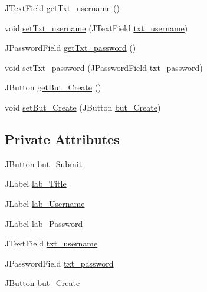 \begin{DoxyCompactItemize}
\item 
J\+Text\+Field \mbox{\hyperlink{classcom_1_1_b_n_u_1_1pages_1_1login_1_1_login_model_ae4bb70b9e0ad4b42bd2391856e3fbf5c}{get\+Txt\+\_\+username}} ()
\item 
void \mbox{\hyperlink{classcom_1_1_b_n_u_1_1pages_1_1login_1_1_login_model_a1308c58f883227b4cffb37662b9983b7}{set\+Txt\+\_\+username}} (J\+Text\+Field \mbox{\hyperlink{classcom_1_1_b_n_u_1_1pages_1_1login_1_1_login_model_ad898496e90497b10e54c04fdfb1ce988}{txt\+\_\+username}})
\item 
J\+Password\+Field \mbox{\hyperlink{classcom_1_1_b_n_u_1_1pages_1_1login_1_1_login_model_a7df9012b5e9dbde1efdd6ba039e95f69}{get\+Txt\+\_\+password}} ()
\item 
void \mbox{\hyperlink{classcom_1_1_b_n_u_1_1pages_1_1login_1_1_login_model_adc19c49064f87cdd3a3c8acfe7d39295}{set\+Txt\+\_\+password}} (J\+Password\+Field \mbox{\hyperlink{classcom_1_1_b_n_u_1_1pages_1_1login_1_1_login_model_a04fd2b2936a74097afe1abcb8fb78da7}{txt\+\_\+password}})
\item 
J\+Button \mbox{\hyperlink{classcom_1_1_b_n_u_1_1pages_1_1login_1_1_login_model_a42a756a69cf1ce361a41ba4ba6b097cf}{get\+But\+\_\+\+Create}} ()
\item 
void \mbox{\hyperlink{classcom_1_1_b_n_u_1_1pages_1_1login_1_1_login_model_a6abd1760149f1a682fff4cd70cd57b74}{set\+But\+\_\+\+Create}} (J\+Button \mbox{\hyperlink{classcom_1_1_b_n_u_1_1pages_1_1login_1_1_login_model_a2bc32c619393c5c5e782667c6e3bc00e}{but\+\_\+\+Create}})
\end{DoxyCompactItemize}
\subsection*{Private Attributes}
\begin{DoxyCompactItemize}
\item 
J\+Button \mbox{\hyperlink{classcom_1_1_b_n_u_1_1pages_1_1login_1_1_login_model_a3e759762502ffaf68c954f69f52aee0a}{but\+\_\+\+Submit}}
\item 
J\+Label \mbox{\hyperlink{classcom_1_1_b_n_u_1_1pages_1_1login_1_1_login_model_ab51c28183844a2ea75a7ee6ac940d946}{lab\+\_\+\+Title}}
\item 
J\+Label \mbox{\hyperlink{classcom_1_1_b_n_u_1_1pages_1_1login_1_1_login_model_a8336b61544313aa6a50f32be5fb3608b}{lab\+\_\+\+Username}}
\item 
J\+Label \mbox{\hyperlink{classcom_1_1_b_n_u_1_1pages_1_1login_1_1_login_model_a15b2461ac4d3a182cdfafe84f1f0c816}{lab\+\_\+\+Password}}
\item 
J\+Text\+Field \mbox{\hyperlink{classcom_1_1_b_n_u_1_1pages_1_1login_1_1_login_model_ad898496e90497b10e54c04fdfb1ce988}{txt\+\_\+username}}
\item 
J\+Password\+Field \mbox{\hyperlink{classcom_1_1_b_n_u_1_1pages_1_1login_1_1_login_model_a04fd2b2936a74097afe1abcb8fb78da7}{txt\+\_\+password}}
\item 
J\+Button \mbox{\hyperlink{classcom_1_1_b_n_u_1_1pages_1_1login_1_1_login_model_a2bc32c619393c5c5e782667c6e3bc00e}{but\+\_\+\+Create}}
\end{DoxyCompactItemize}


